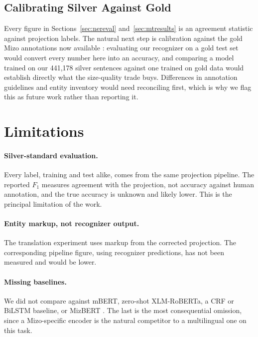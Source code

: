 \documentclass[acmsmall,screen,review]{acmart}
\begin{document}
\subsection{Calibrating Silver Against Gold}
\label{sec:discussion:calibration}

Every figure in Sections~\ref{sec:nereval} and~\ref{sec:mtresults} is an
agreement statistic against projection labels. The natural next step is
calibration against the gold Mizo annotations now available
\citep{ghosh2025mizokhasi}: evaluating our recognizer on a gold test set would
convert every number here into an accuracy, and comparing a model trained on our
441,178 silver sentences against one trained on gold data would establish
directly what the size-quality trade buys. Differences in annotation guidelines
and entity inventory would need reconciling first, which is why we flag this as
future work rather than reporting it.

\section{Limitations}
\label{sec:limitations}

\paragraph{Silver-standard evaluation.}
Every label, training and test alike, comes from the same projection pipeline.
The reported $F_1$ measures agreement with the projection, not accuracy against
human annotation, and the true accuracy is unknown and likely lower. This is the
principal limitation of the work.

\paragraph{Entity markup, not recognizer output.}
The translation experiment uses markup from the corrected projection. The
corresponding pipeline figure, using recognizer predictions, has not been
measured and would be lower.

\paragraph{Missing baselines.}
We did not compare against mBERT, zero-shot XLM-RoBERTa, a CRF or BiLSTM
baseline, or MizBERT \citep{lalramhluna2024mizbert}. The last is the most
consequential omission, since a Mizo-specific encoder is the natural competitor
to a multilingual one on this task.
\end{document}
